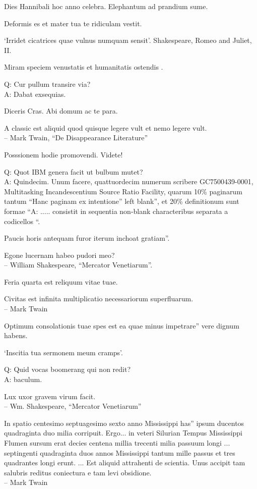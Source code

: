\documentclass[titlepage,12pt]{memoir}
\begin{document}
Dies Hannibali hoc anno celebra. Elephantum ad prandium sume.

Deformis es et mater tua te ridiculam vestit.

‘Irridet cicatrices quae vulnus numquam sensit’.
Shakespeare, Romeo and Juliet, II.

 Miram speciem venustatis et humanitatis ostendis .

Q: Cur pullum transire via?\\
A: Dabat exsequias.

Diceris Cras. Abi domum ac te para.

A classic est aliquid quod quisque legere vult
et nemo legere vult.
\\-- Mark Twain, “De Disappearance Literature”

Posssionem hodie promovendi. Videte!

Q: Quot IBM genera facit ut bulbum mutet?\\
A: Quindecim. Unum facere, quattuordecim numerum scribere
GC7500439-0001, Multitasking Incandescentium Source Ratio Facility,
quarum 10\% paginarum tantum “Hanc paginam ex intentione”
left blank”, et 20\% definitionum sunt formae “A: .....
consistit in sequentia non-blank characteribus separata a codicellos “.

Paucis horis antequam furor iterum inchoat gratiam”.

Egone lucernam habeo pudori meo?
\\-- William Shakespeare, “Mercator Venetiarum”.

Feria quarta est reliquum vitae tuae.

Civitas est infinita multiplicatio necessariorum superfluarum.
\\-- Mark Twain

Optimum consolationis tuae spes est ea quae minus impetrare”
vere dignum habens.

‘Inscitia tua sermonem meum cramps’.

Q: Quid vocas boomerang qui non redit?\\
A: baculum.

Lux uxor gravem virum facit.
\\-- Wm. Shakespeare, “Mercator Venetiarum”

In spatio centesimo septuagesimo sexto anno Mississippi has”
ipsum ducentos quadraginta duo milia corripuit. Ergo... in veteri
Silurian Tempus Mississippi Flumen sursum erat decies centena millia trecenti
milia passuum longi ... septingenti quadraginta duos annos
Mississippi tantum mille passus et tres quadrantes longi erunt. ... Est
aliquid attrahenti de scientia. Unus accipit tam salubris reditus
coniectura e tam levi obsidione.
\\-- Mark Twain
\end{document}

